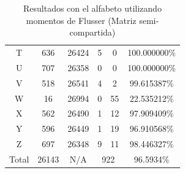 \documentclass[a4paper, 11pt, oneside]{report}
\begin{document}
\begin{table}
\begin{tabular}{|c|c|c|c|c|c|}
T & 636 & 26424 & 5 & 0 & 100.000000\% \\ 
U & 707 & 26358 & 0 & 0 & 100.000000\% \\ 
V & 518 & 26541 & 4 & 2 & 99.615387\% \\ 
W & 16 & 26994 & 0 & 55 & 22.535212\% \\ 
X & 562 & 26490 & 1 & 12 & 97.909409\% \\ 
Y & 596 & 26449 & 1 & 19 & 96.910568\% \\ 
Z & 697 & 26348 & 9 & 11 & 98.446327\% \\ 
\hline
Total & 26143 & N/A & \multicolumn{2}{|c|}{922} & 96.5934\% \\
\hline
\end{tabular}
\caption{Resultados con el alfabeto utilizando momentos de Flusser (Matriz semi-compartida)}
\label{tb:alphaFlShared}
\end{table}
\end{document}

